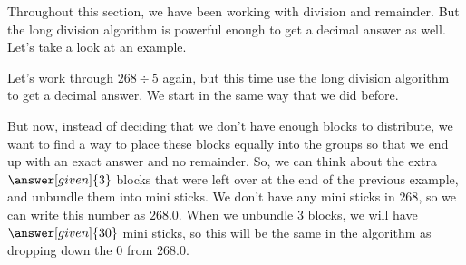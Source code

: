 \documentclass{ximera}
\begin{document}
Throughout this section, we have been working with division and remainder. But the long division algorithm is powerful enough to get a decimal answer as well. Let's take a look at an example.
\begin{example}
Let's work through $268 \div 5$ again, but this time use the long division algorithm to get a decimal answer. We start in the same way that we did before.
\begin{image}
\end{image}
But now, instead of deciding that we don't have enough blocks to distribute, we want to find a way to place these blocks equally into the groups so that we end up with an exact answer and no remainder. So, we can think about the extra $\answer[given]{3}$ blocks that were left over at the end of the previous example, and unbundle them into mini sticks. We don't have any mini sticks in $268$, so we can write this number as $268.0$. When we unbundle $3$ blocks, we will have $\answer[given]{30}$ mini sticks, so this will be the same in the algorithm as dropping down the $0$ from $268.0$.
\begin{image}
\end{image}
\end{example}
\end{document}
